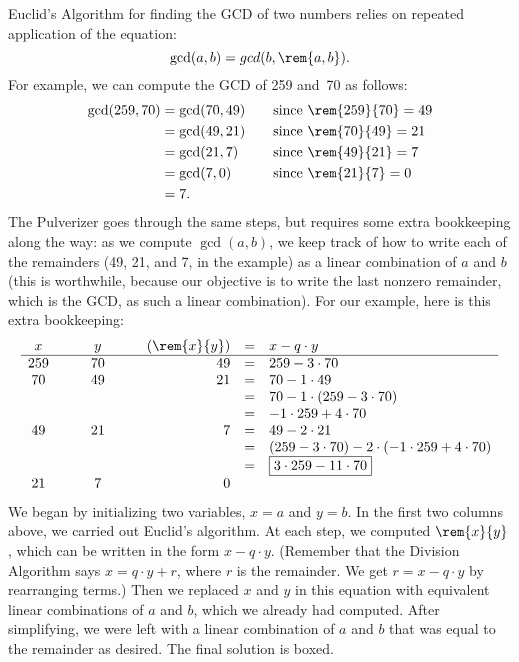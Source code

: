Euclid's Algorithm for finding the GCD of two numbers relies on
repeated application of the equation:
\begin{equation*}
    \gcd(a, b) = gcd(b, \rem{a, b}).
\end{equation*}
For example, we can compute the GCD of 259 and~70 as follows:
\begin{align*}
\gcd(259, 70)
    & = \gcd(70, 49) & \quad & \text{since $\rem{259}{70} = 49$}\\
    & = \gcd(49, 21) && \text{since $\rem{70}{49} = 21$} \\
    & = \gcd(21, 7) && \text{since $\rem{49}{21} = 7$} \\
    & = \gcd(7, 0) && \text{since $\rem{21}{7} = 0$} \\
    & = 7.
\end{align*}
The Pulverizer goes through the same steps, but requires some extra
bookkeeping along the way: as we compute $\gcd(a, b)$, we keep track
of how to write each of the remainders (49, 21, and 7, in the example)
as a linear combination of $a$ and $b$ (this is worthwhile, because
our objective is to write the last nonzero remainder, which is the
GCD, as such a linear combination).  For our example, here is this
extra bookkeeping:
\[
\begin{array}{ccccrcl}
x & \quad & y & \quad & (\rem{x}{y}) & = & x - q \cdot y \\ \hline
259 && 70 && 49 & = &   259 - 3 \cdot 70 \\
70 && 49 && 21  & = &   70 - 1 \cdot 49 \\
&&&&            & = &   70 - 1 \cdot (259 - 3 \cdot 70) \\
&&&&            & = &   -1 \cdot 259 + 4 \cdot 70 \\
49 && 21 && 7   & = &   49 - 2 \cdot 21 \\
&&&&            & = &   (259 - 3 \cdot 70) -
                                2 \cdot (-1 \cdot 259 + 4 \cdot 70) \\
&&&&            & = &   \fbox{$3 \cdot 259 - 11 \cdot 70$} \\
21 && 7 && 0
\end{array}
\]
We began by initializing two variables, $x = a$ and $y = b$.  In the
first two columns above, we carried out Euclid's algorithm.  At each
step, we computed $\rem{x}{y}$, which can be written in the form $x - q
\cdot y$.  (Remember that the Division Algorithm says $x = q \cdot y +
r$, where $r$ is the remainder.  We get $r = x - q \cdot y$ by
rearranging terms.)  Then we replaced $x$ and $y$ in this equation
with equivalent linear combinations of $a$ and $b$, which we already
had computed.  After simplifying, we were left with a linear
combination of $a$ and $b$ that was equal to the remainder as desired.
The final solution is boxed.

